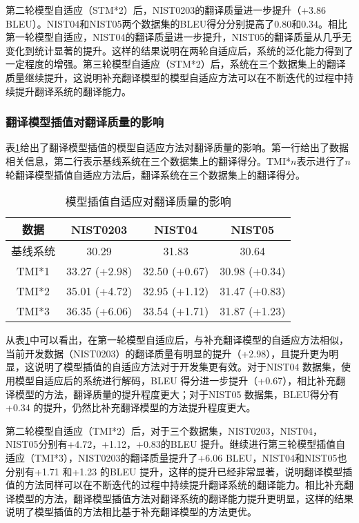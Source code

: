 \documentclass[master, winfont]{njuthesis}
\begin{document}
第二轮模型自适应（STM*2）后，NIST0203的翻译质量进一步提升（+3.86 BLEU）。NIST04和NIST05两个数据集的BLEU得分分别提高了0.80和0.34。相比第一轮模型自适应，NIST04的翻译质量进一步提升，NIST05的翻译质量从几乎无变化到统计显著的提升。这样的结果说明在两轮自适应后，系统的泛化能力得到了一定程度的增强。第三轮模型自适应（STM*2）后，系统在三个数据集上的翻译质量继续提升，这说明补充翻译模型的模型自适应方法可以在不断迭代的过程中持续提升翻译系统的翻译能力。
\subsubsection{翻译模型插值对翻译质量的影响}
表\ref{table:adaptation2}给出了翻译模型插值的模型自适应方法对翻译质量的影响。第一行给出了数据相关信息，第二行表示基线系统在三个数据集上的翻译得分。TMI*$n$表示进行了$n$轮翻译模型插值自适应方法后，翻译系统在三个数据集上的翻译得分。

\begin{table}[!htb]
\begin{center}
\begin{tabular}{c|c|c|c}
\hline
数据& NIST0203 & NIST04 & NIST05\\
\hline
基线系统 & 30.29 & 31.83 & 30.64 \\
\hline
TMI*1 & 33.27 (+2.98) & 32.50 (+0.67) & 30.98 (+0.34)\\
\hline
TMI*2 & 35.01 (+4.72) & 32.95 (+1.12) & 31.47 (+0.83)\\
\hline
TMI*3 & 36.35 (+6.06) & 33.54 (+1.71) & 31.87 (+1.23)\\
\hline
\end{tabular}
\end{center}
\caption{\label{table:adaptation2} 模型插值自适应对翻译质量的影响}
\end{table}

从表\ref{table:adaptation2}中可以看出，在第一轮模型自适应后，与补充翻译模型的自适应方法相似，当前开发数据（NIST0203）的翻译质量有明显的提升（+2.98），且提升更为明显，这说明了模型插值的自适应方法对于开发集更有效。对于NIST04 数据集，使用模型自适应后的系统进行解码，BLEU 得分进一步提升（+0.67），相比补充翻译模型的方法，翻译质量的提升程度更大；对于NIST05 数据集，BLEU得分有+0.34 的提升，仍然比补充翻译模型的方法提升程度更大。

第二轮模型自适应（TMI*2）后，对于三个数据集，NIST0203，NIST04，NIST05分别有+4.72，+1.12，+0.83的BLEU 提升。继续进行第三轮模型插值自适应（TMI*3），NIST0203的翻译质量提升了+6.06 BLEU，NIST04和NIST05也分别有+1.71 和+1.23 的BLEU 提升，这样的提升已经非常显著，说明翻译模型插值的方法同样可以在不断迭代的过程中持续提升翻译系统的翻译能力。相比补充翻译模型的方法，翻译模型插值方法对翻译系统的翻译能力提升更明显，这样的结果说明了模型插值的方法相比基于补充翻译模型的方法更优。
\end{document}
